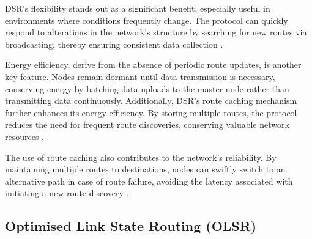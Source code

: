 DSR's flexibility stands out as a significant benefit, especially useful in environments where conditions frequently change. The protocol can quickly respond to alterations in the network's structure by searching for new routes via broadcasting, thereby ensuring consistent data collection \cite{5497794}. 

Energy efficiency, derive from the absence of periodic route updates, is another key feature. Nodes remain dormant until data transmission is necessary, conserving energy by batching data uploads to the master node rather than transmitting data continuously. Additionally, DSR's route caching mechanism further enhances its energy efficiency. By storing multiple routes, the protocol reduces the need for frequent route discoveries, conserving valuable network resources \cite{1431308}.

The use of route caching also contributes to the network's reliability. By maintaining multiple routes to destinations, nodes can swiftly switch to an alternative path in case of route failure, avoiding the latency associated with initiating a new route discovery \cite{1431308}.

\subsection{Optimised Link State Routing (OLSR)}\label{sec:lr_oslr}

